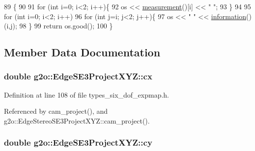 \begin{DoxyCode}
89                                                   \{
90 
91   \textcolor{keywordflow}{for} (\textcolor{keywordtype}{int} i=0; i<2; i++)\{
92     os << \hyperlink{classg2o_1_1BaseEdge_a8c20e7ffa66bb7a4a02c8cee82e89c8b}{measurement}()[i] << \textcolor{stringliteral}{" "};
93   \}
94 
95   \textcolor{keywordflow}{for} (\textcolor{keywordtype}{int} i=0; i<2; i++)
96     \textcolor{keywordflow}{for} (\textcolor{keywordtype}{int} j=i; j<2; j++)\{
97       os << \textcolor{stringliteral}{" "} <<  \hyperlink{classg2o_1_1BaseEdge_ab682086df7223ce2b039d652416ddc23}{information}()(i,j);
98     \}
99   \textcolor{keywordflow}{return} os.good();
100 \}
\end{DoxyCode}


\subsection{Member Data Documentation}
\subsubsection[{\texorpdfstring{cx}{cx}}]{\setlength{\rightskip}{0pt plus 5cm}double g2o\+::\+Edge\+S\+E3\+Project\+X\+Y\+Z\+::cx}\hypertarget{classg2o_1_1EdgeSE3ProjectXYZ_ace052104b07ec272eb5f254254ead5e5}{}\label{classg2o_1_1EdgeSE3ProjectXYZ_ace052104b07ec272eb5f254254ead5e5}


Definition at line 108 of file types\+\_\+six\+\_\+dof\+\_\+expmap.\+h.



Referenced by cam\+\_\+project(), and g2o\+::\+Edge\+Stereo\+S\+E3\+Project\+X\+Y\+Z\+::cam\+\_\+project().

\subsubsection[{\texorpdfstring{cy}{cy}}]{\setlength{\rightskip}{0pt plus 5cm}double g2o\+::\+Edge\+S\+E3\+Project\+X\+Y\+Z\+::cy}\hypertarget{classg2o_1_1EdgeSE3ProjectXYZ_af590c37d535ce7e71be5ce4ae368e9c1}{}\label{classg2o_1_1EdgeSE3ProjectXYZ_af590c37d535ce7e71be5ce4ae368e9c1}


